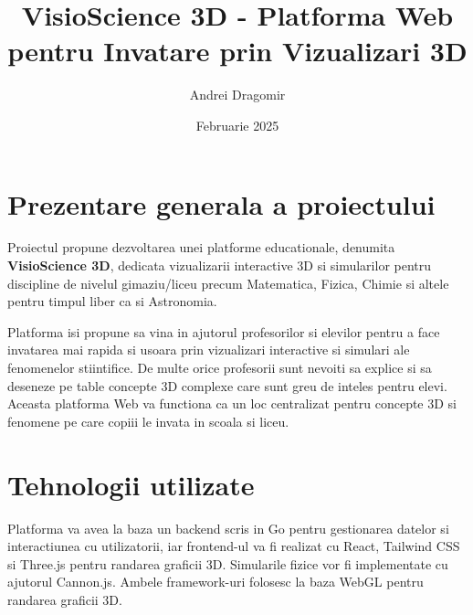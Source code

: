 \documentclass[a4paper,12pt]{article}
\title{VisioScience 3D - Platforma Web pentru Invatare prin Vizualizari 3D}
\author{Andrei Dragomir}
\date{Februarie 2025}
\begin{document}
\maketitle

\section*{Prezentare generala a proiectului}
Proiectul propune dezvoltarea unei platforme educationale, denumita \textbf{VisioScience 3D}, 
dedicata vizualizarii interactive 3D si simularilor pentru discipline de nivelul gimaziu/liceu
precum Matematica, Fizica, Chimie si altele pentru timpul liber ca si Astronomia.

Platforma isi propune sa vina in ajutorul profesorilor si elevilor pentru a face invatarea mai 
rapida si usoara prin vizualizari interactive si simulari ale fenomenelor stiintifice. De multe orice
profesorii sunt nevoiti sa explice si sa deseneze pe table concepte 3D complexe care sunt greu de
inteles pentru elevi. Aceasta platforma Web va functiona ca un loc centralizat pentru concepte 
3D si fenomene pe care copiii le invata in scoala si liceu.

\section*{Tehnologii utilizate}

Platforma va avea la baza un backend scris in Go pentru gestionarea datelor si interactiunea cu
utilizatorii, iar frontend-ul va fi realizat cu React, Tailwind CSS si Three.js pentru randarea graficii 3D.
Simularile fizice vor fi implementate cu ajutorul Cannon.js. Ambele framework-uri folosesc la 
baza WebGL pentru randarea graficii 3D.
\end{document}
